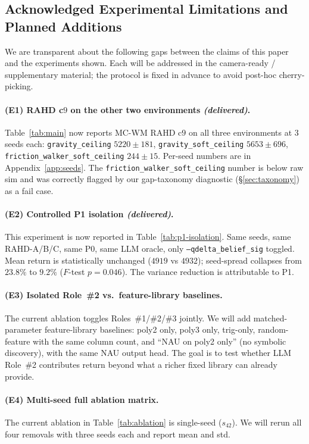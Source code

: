 \documentclass{article}
\theoremstyle{definition}
\begin{document}
\subsection{Acknowledged Experimental Limitations and Planned Additions}
\label{sec:experimental-todo}

We are transparent about the following gaps between the claims of this
paper and the experiments shown.  Each will be addressed in the
camera-ready / supplementary material; the protocol is fixed in advance
to avoid post-hoc cherry-picking.

\paragraph{(E1) RAHD c$9$ on the other two environments
\emph{(delivered)}.}  Table~\ref{tab:main} now reports MC-WM RAHD c$9$
on all three environments at $3$ seeds each: \texttt{gravity\_ceiling}
$5220\!\pm\!181$, \texttt{gravity\_soft\_ceiling} $5653\!\pm\!696$,
\texttt{friction\_walker\_soft\_ceiling} $244\!\pm\!15$.  Per-seed
numbers are in Appendix~\ref{app:seeds}.  The
\texttt{friction\_walker\_soft\_ceiling} number is below raw sim and
was correctly flagged by our gap-taxonomy diagnostic
(§\ref{sec:taxonomy}) as a fail case.

\paragraph{(E2) Controlled P1 isolation \emph{(delivered)}.}
This experiment is now reported in Table~\ref{tab:p1-isolation}.  Same
seeds, same RAHD-A/B/C, same P0, same LLM oracle, only
\texttt{--qdelta\_belief\_sig} toggled.  Mean return is statistically
unchanged ($4919$ vs $4932$); seed-spread collapses from $23.8\%$ to
$9.2\%$ ($F$-test $p=0.046$).  The variance reduction is attributable
to P1.

\paragraph{(E3) Isolated Role~\#2 vs.\ feature-library baselines.}
The current ablation toggles Roles~\#1/\#2/\#3 jointly.  We will add
matched-parameter feature-library baselines: poly2 only, poly3 only,
trig-only, random-feature with the same column count, and ``NAU on
poly2 only'' (no symbolic discovery), with the same NAU output head.
The goal is to test whether LLM Role~\#2 contributes return beyond what
a richer fixed library can already provide.

\paragraph{(E4) Multi-seed full ablation matrix.}
The current ablation in Table~\ref{tab:ablation} is single-seed
($s_{42}$).  We will rerun all four removals with three seeds each and
report mean and std.
\end{document}
